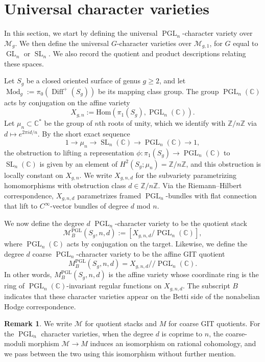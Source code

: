 \documentclass[11pt,reqno]{amsart}
\theoremstyle{plain} %
\theoremstyle{definition}
\newtheorem{remark}[theorem]{Remark}
\newcommand{\CC}{\mathbb{C}}
\newcommand{\Hom}{\mathrm{Hom}}
\newcommand{\M}{\mathcal{M}}
\newcommand{\ZZ}{\mathbb{Z}}
\DeclareMathOperator{\Diff}{Diff}
\DeclareMathOperator{\GL}{GL}
\DeclareMathOperator{\SL}{SL}
\DeclareMathOperator{\PGL}{PGL}
\DeclareMathOperator{\Mod}{Mod}
\providecommand\sslash{/\!\!/}
\begin{document}

\section{Universal character varieties} \label{sec: Betti}

In this section, we start by defining the universal $\PGL_n$-character variety over $\M_g$. We then define the universal $G$-character varieties over $\M_{g,1}$, for $G$ equal to $\GL_n$ or $\SL_n$. We also record the quotient and product descriptions relating these spaces. %

\medskip





Let $S_g$ be a closed oriented surface of genus $g \ge 2$, and let $\Mod_g := \pi_0(\Diff^+(S_g))$ be its mapping class group.  The group  $\PGL_n(\CC)$ acts by conjugation on the affine variety
\[
X_{g,n} := \Hom(\pi_1(S_g), \PGL_n(\CC)).
\]
Let $\mu_n \subset \CC^*$ be the group of $n$th roots of unity, which we identify with $\ZZ/n\ZZ$ via $d \mapsto e^{2\pi i d / n}$. By the short exact sequence %
$$1 \to \mu_n \to \SL_n(\CC) \to \PGL_n(\CC) \to 1,$$
the obstruction to lifting a representation $\phi \colon \pi_1(S_g) \to \PGL_n(\CC)$ to $\SL_n(\CC)$ is given by an element of $H^2(S_g; \mu_n) = \ZZ/n\ZZ$, and this obstruction is locally constant on $X_{g,n}$.  We write $X_{g,n,d}$ for the subvariety parametrizing homomorphisms with obstruction class $d \in \ZZ/n\ZZ$. Via the Riemann--Hilbert correspondence, $X_{g,n,d}$ parametrizes framed $\PGL_n$-bundles with flat connection that lift to $C^\infty$-vector bundles of degree $d$ mod $n$.

We now define the degree $d$ $\PGL_n$-character variety to be the quotient stack
\[
\M_{B}^{\PGL}(S_g,n,d) := [X_{g,n,d} / \PGL_n(\CC)],
\]
where $\PGL_n(\CC)$ acts by conjugation on the target. Likewise, we define the degree $d$ coarse $\PGL_n$-character variety to be the affine GIT quotient
\begin{equation} \label{eq:affineGIT-PGL}
M_B^{\PGL}(S_g,n,d) = X_{g,n,d} \sslash \PGL_n(\CC).
\end{equation}
In other words, $M_B^{\PGL}(S_g,n,d)$ is the affine variety whose coordinate ring is the ring of $\PGL_n(\CC)$-invariant regular functions on $X_{g,n,d}$. The subscript $B$ indicates that these character varieties appear on the Betti side of the nonabelian Hodge correspondence.

\begin{remark}
We write $\M$ for quotient stacks and $M$ for coarse GIT quotients. For the $\PGL_n$ character varieties, when the degree $d$ is coprime to $n$, the coarse-moduli morphism $\M \to M$ induces an isomorphism on rational cohomology, and we pass between the two using this isomorphism without further mention.
\end{remark}
\end{document}
